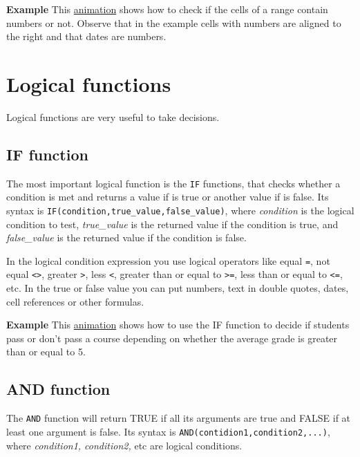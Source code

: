 \textbf{Example} This \href{http://aprendeconalf.es/office/excel/manual/img/example_function_isnumber.gif}{animation}
shows how to check if the cells of a range contain numbers or not. Observe that in the example cells with numbers are aligned to the right and that dates are numbers.



\section{Logical functions}\hypertarget{logical-functions}{}\label{logical-functions}

Logical functions are very useful to take decisions.

\subsection{IF function}\hypertarget{if-function}{}\label{if-function}

The most important logical function is the \texttt{IF} functions, that checks whether a condition is met and returns a
value if is true or another value if is false. Its syntax is \texttt{IF(condition,true\_value,false\_value)}, where
\emph{condition} is the logical condition to test, \emph{true\_value} is the returned value if the condition is true,
and \emph{false\_value} is the returned value if the condition is false.

In the logical condition expression you use logical operators like equal \texttt{=}, not equal
\texttt{\textless{}\textgreater{}}, greater \texttt{\textgreater{}}, less \texttt{\textless{}}, greater than or equal to
\texttt{\textgreater{}=}, less than or equal to \texttt{\textless{}=}, etc. In the true or false value you can put
numbers, text in double quotes, dates, cell references or other formulas.

\textbf{Example} This \href{http://aprendeconalf.es/office/excel/manual/img/example_function_if.gif}{animation} shows how to use the IF function to decide if students pass or don't pass a course depending on whether the average grade is greater than or equal to 5.

\subsection{AND function}\hypertarget{and-function}{}\label{and-function}

The \texttt{AND} function will return TRUE if all its arguments are true and FALSE if at least one argument is false. Its syntax is \texttt{AND(contidion1,condition2,...)}, where \emph{condition1, condition2,} etc are logical conditions.


